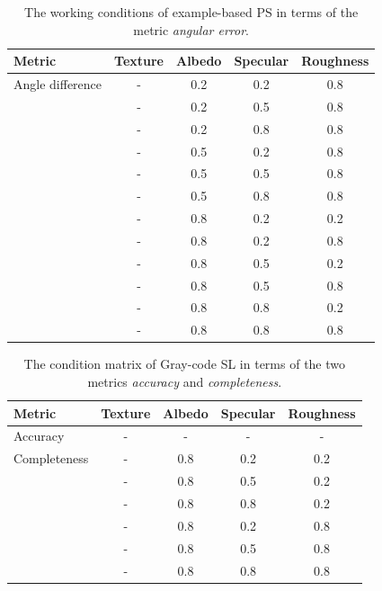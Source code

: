 \begin{table}[!htbp]
\centering
\begin{tabular}{l*{4}{c}}
\hline
\textbf{Metric} & Texture & Albedo & Specular & Roughness\\
\hline
Angle difference& - & 0.2 & 0.2 & 0.8\\
                & - & 0.2 & 0.5 & 0.8\\
                & - & 0.2 & 0.8 & 0.8\\
                & - & 0.5 & 0.2 & 0.8\\
                & - & 0.5 & 0.5 & 0.8\\
                & - & 0.5 & 0.8 & 0.8\\
                & - & 0.8 & 0.2 & 0.2\\ %
                & - & 0.8 & 0.2 & 0.8\\
                & - & 0.8 & 0.5 & 0.2\\
                & - & 0.8 & 0.5 & 0.8\\
                & - & 0.8 & 0.8 & 0.2\\ %
                & - & 0.8 & 0.8 & 0.8\\
\hline
\end{tabular}
\caption{The working conditions of example-based PS in terms of the metric \textit{angular error}.}
\label{tab:ps_training_result}
\end{table}

\begin{table}[!htbp]
\centering
\begin{tabular}{l*{4}{c}}
\hline
\textbf{Metric} & Texture & Albedo & Specular & Roughness\\
\hline
Accuracy    & - & - & - & -\\
\hline
Completeness& - & 0.8 & 0.2 & 0.2\\
            & - & 0.8 & 0.5 & 0.2\\
            & - & 0.8 & 0.8 & 0.2\\
            & - & 0.8 & 0.2 & 0.8\\
            & - & 0.8 & 0.5 & 0.8\\
            & - & 0.8 & 0.8 & 0.8\\
\hline
\end{tabular}
\caption{The condition matrix of Gray-code SL in terms of the two metrics \textit{accuracy} and \textit{completeness}.}
\label{tab:sl_training_result}
\end{table}

